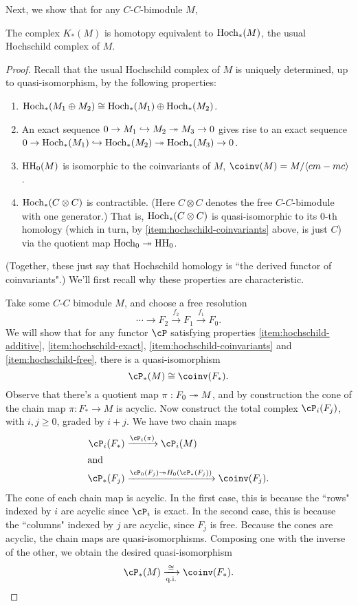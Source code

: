 Next, we show that for any $C$-$C$-bimodule $M$,
\begin{prop} \label{prop:hoch}
The complex $K_*(M)$ is homotopy equivalent to $\operatorname{Hoch}_*(M)$, the usual
Hochschild complex of $M$.
\end{prop}
\begin{proof}
Recall that the usual Hochschild complex of $M$ is uniquely determined,
up to quasi-isomorphism, by the following properties:
\begin{enumerate}
\item \label{item:hochschild-additive}%
$\operatorname{Hoch}_*(M_1 \oplus M_2) \cong \operatorname{Hoch}_*(M_1) \oplus \operatorname{Hoch}_*(M_2)$.
\item \label{item:hochschild-exact}%
An exact sequence $0 \to M_1 \hookrightarrow M_2 \twoheadrightarrow M_3 \to 0$ gives rise to an
exact sequence $0 \to \operatorname{Hoch}_*(M_1) \hookrightarrow \operatorname{Hoch}_*(M_2) \twoheadrightarrow \operatorname{Hoch}_*(M_3) \to 0$.
\item \label{item:hochschild-coinvariants}%
$\operatorname{HH}_0(M)$ is isomorphic to the coinvariants of $M$, $\coinv(M) =
M/\langle cm-mc \rangle$.
\item \label{item:hochschild-free}%
$\operatorname{Hoch}_*(C\otimes C)$ is contractible.
(Here $C\otimes C$ denotes
the free $C$-$C$-bimodule with one generator.)
That is, $\operatorname{Hoch}_*(C\otimes C)$ is
quasi-isomorphic to its $0$-th homology (which in turn, by \ref{item:hochschild-coinvariants}
above, is just $C$) via the quotient map $\operatorname{Hoch}_0 \twoheadrightarrow \operatorname{HH}_0$.
\end{enumerate}
(Together, these just say that Hochschild homology is ``the derived functor of coinvariants".)
We'll first recall why these properties are characteristic.

Take some $C$-$C$ bimodule $M$, and choose a free resolution
\begin{equation*}
\cdots \to F_2 \xrightarrow{f_2} F_1 \xrightarrow{f_1} F_0.
\end{equation*}
We will show that for any functor $\cP$ satisfying properties
\ref{item:hochschild-additive}, \ref{item:hochschild-exact},
\ref{item:hochschild-coinvariants} and \ref{item:hochschild-free}, there
is a quasi-isomorphism
$$\cP_*(M) \iso \coinv(F_*).$$
%
Observe that there's a quotient map $\pi: F_0 \twoheadrightarrow M$, and by
construction the cone of the chain map $\pi: F_* \to M$ is acyclic. 
Now construct the total complex $\cP_i(F_j)$, with $i,j \geq 0$, graded by $i+j$. 
We have two chain maps
\begin{align*}
\cP_i(F_*) & \xrightarrow{\cP_i(\pi)} \cP_i(M) \\
\intertext{and}
\cP_*(F_j) & \xrightarrow{\cP_0(F_j) \onto H_0(\cP_*(F_j))} \coinv(F_j).
\end{align*}
The cone of each chain map is acyclic.
In the first case, this is because the ``rows" indexed by $i$ are acyclic since $\cP_i$ is exact.
In the second case, this is because the ``columns" indexed by $j$ are acyclic, since $F_j$ is free.
Because the cones are acyclic, the chain maps are quasi-isomorphisms.
Composing one with the inverse of the other, we obtain the desired quasi-isomorphism
$$\cP_*(M) \quismto \coinv(F_*).$$


\end{proof}

